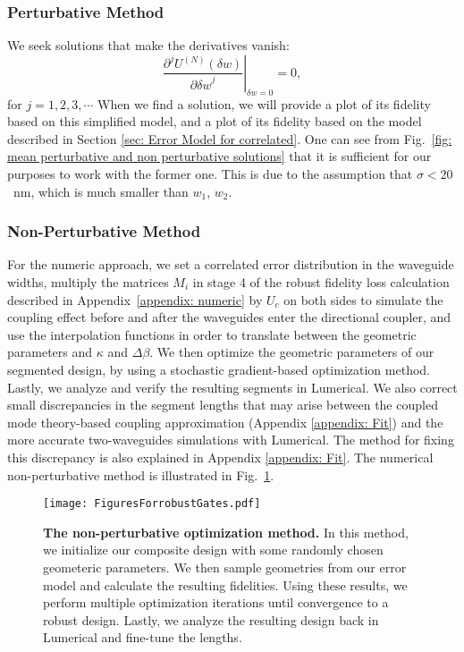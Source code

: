 \documentclass[floatfix,reprint, amsmath,amssymb,aps,superscriptaddress,nofootinbib]{revtex4-2}
\begin{document}
\subsubsection{Perturbative Method \label{sec: method for rho=1 - purturbative}}




We seek solutions that make the derivatives vanish:
\begin{equation}
    \left. \frac{\partial^j U^{\left(N\right)}\left(\delta w\right)}{{\partial \delta w}^j}\right| _{\delta w=0}=0,
\end{equation}
for $j=1,2,3,\cdots$
When we find a solution, we will provide a plot of its fidelity based on this simplified model, and a plot of its fidelity based on the model described in Section \ref{sec: Error Model for correlated}. One can see from Fig.~\ref{fig: mean perturbative and non perturbative solutions} that it is sufficient for our purposes to work with the former one. This is due to the assumption that $\sigma<20$~nm, which is much smaller than $w_1$, $w_2$.

\subsubsection{Non-Perturbative Method \label{sec: method for rho=1 - non-perturbative}}

For the numeric approach, we set a correlated error distribution in the waveguide widths, multiply the matrices $M_i$ in stage 4 of the robust fidelity loss calculation described in Appendix~\ref{appendix: numeric} by $U_c$ on both sides to simulate the coupling effect before and after the waveguides enter the directional coupler, and use the interpolation functions in order to translate between the geometric parameters and $\kappa$ and $\Delta\beta$.  We then optimize the geometric parameters of our segmented design, by using a stochastic gradient-based optimization method. Lastly, we analyze and verify the resulting segments in Lumerical. We also correct small discrepancies in the segment lengths that may arise between the coupled mode theory-based coupling approximation (Appendix \ref{appendix: Fit}) and the more accurate two-waveguides simulations with Lumerical. The method for fixing this discrepancy is also explained in Appendix \ref{appendix: Fit}.
The numerical non-perturbative method is illustrated in Fig.~\ref{fig: The non-perturbative optimization method}.

\begin{figure}[tb]{}
        \texttt{[image: FiguresForrobustGates.pdf]}
        \caption{\textbf{The non-perturbative optimization method.} In this method, we initialize our composite design with some randomly chosen geometeric parameters. We then sample geometries from our error model and calculate the resulting fidelities. Using these results, we perform multiple optimization iterations until convergence to a robust design. Lastly, we analyze the resulting design back in Lumerical and fine-tune the lengths.}
         \label{fig: The non-perturbative optimization method}
     \end{figure}
\end{document}
